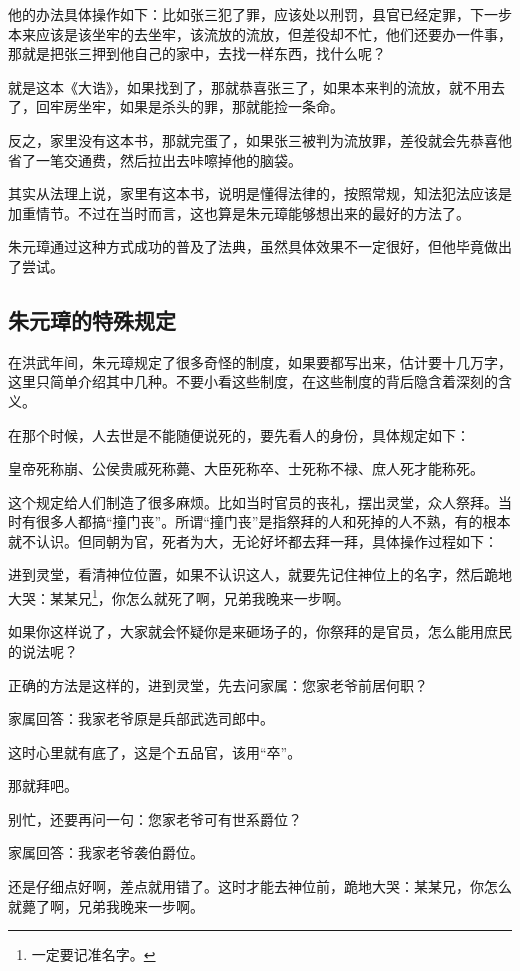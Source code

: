 \begin{multicols}{\theparacolNo}
		他的办法具体操作如下：比如张三犯了罪，应该处以刑罚，县官已经定罪，下一步本来应该是该坐牢的去坐牢，该流放的流放，但差役却不忙，他们还要办一件事，那就是把张三押到他自己的家中，去找一样东西，找什么呢？

		就是这本《大诰》，如果找到了，那就恭喜张三了，如果本来判的流放，就不用去了，回牢房坐牢，如果是杀头的罪，那就能捡一条命。

		反之，家里没有这本书，那就完蛋了，如果张三被判为流放罪，差役就会先恭喜他省了一笔交通费，然后拉出去咔嚓掉他的脑袋。

		其实从法理上说，家里有这本书，说明是懂得法律的，按照常规，知法犯法应该是加重情节。不过在当时而言，这也算是朱元璋能够想出来的最好的方法了。

		朱元璋通过这种方式成功的普及了法典，虽然具体效果不一定很好，但他毕竟做出了尝试。

		\subsection{朱元璋的特殊规定}
		在洪武年间，朱元璋规定了很多奇怪的制度，如果要都写出来，估计要十几万字，这里只简单介绍其中几种。不要小看这些制度，在这些制度的背后隐含着深刻的含义。

		在那个时候，人去世是不能随便说死的，要先看人的身份，具体规定如下：

		皇帝死称崩、公侯贵戚死称薨、大臣死称卒、士死称不禄、庶人死才能称死。

		这个规定给人们制造了很多麻烦。比如当时官员的丧礼，摆出灵堂，众人祭拜。当时有很多人都搞“撞门丧”。所谓“撞门丧”是指祭拜的人和死掉的人不熟，有的根本就不认识。但同朝为官，死者为大，无论好坏都去拜一拜，具体操作过程如下：

		进到灵堂，看清神位位置，如果不认识这人，就要先记住神位上的名字，然后跪地大哭：某某兄\footnote{一定要记准名字。}，你怎么就死了啊，兄弟我晚来一步啊。

		如果你这样说了，大家就会怀疑你是来砸场子的，你祭拜的是官员，怎么能用庶民的说法呢？

		正确的方法是这样的，进到灵堂，先去问家属：您家老爷前居何职？

		家属回答：我家老爷原是兵部武选司郎中。

		这时心里就有底了，这是个五品官，该用“卒”。

		那就拜吧。

		别忙，还要再问一句：您家老爷可有世系爵位？

		家属回答：我家老爷袭伯爵位。

		还是仔细点好啊，差点就用错了。这时才能去神位前，跪地大哭：某某兄，你怎么就薨了啊，兄弟我晚来一步啊。


\end{multicols}
